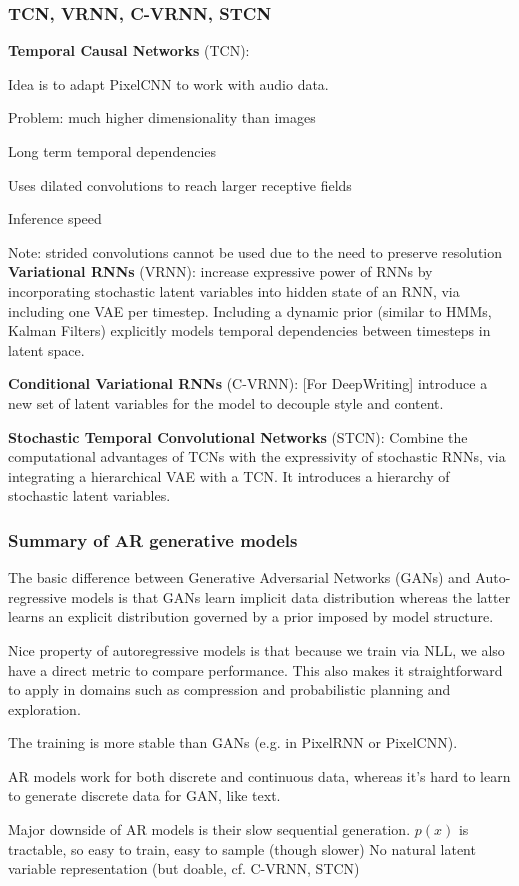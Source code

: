\documentclass[12pt]{article}
\begin{document}
\subsubsection{TCN, VRNN, C-VRNN, STCN}
\textbf{Temporal Causal Networks} (TCN):
\ulb
\item Idea is to adapt PixelCNN to work with audio data.
\item Problem: much higher dimensionality than images
\item Long term temporal dependencies
\item Uses dilated convolutions to reach larger receptive fields
\item Inference speed
\item Note: strided convolutions cannot be used due to the need to preserve resolution
\ule
\textbf{Variational RNNs} (VRNN): increase expressive power of RNNs by incorporating stochastic latent variables into hidden state of an RNN, via including one VAE per timestep. Including a dynamic prior (similar to HMMs, Kalman Filters) explicitly models temporal dependencies between timesteps in latent space.
\par \textbf{Conditional Variational RNNs} (C-VRNN): [For DeepWriting] introduce a new set of latent variables for the model to decouple style and content.
\par \textbf{Stochastic Temporal Convolutional Networks} (STCN): Combine the computational advantages of TCNs with the expressivity of stochastic RNNs, via integrating a hierarchical VAE with a TCN. It introduces a hierarchy of stochastic latent variables.

\subsubsection{Summary of AR generative models}
\ulb
\item The basic difference between Generative Adversarial Networks (GANs) and Auto-regressive models is that GANs learn implicit data distribution whereas the latter learns an explicit distribution governed by a prior imposed by model structure.
\item Nice property of autoregressive models is that because we train via NLL, we also have a direct metric to compare performance. This also makes it straightforward to apply in domains such as compression and probabilistic planning and exploration.
\item The training is more stable than GANs (e.g. in PixelRNN or PixelCNN).
\item AR models work for both discrete and continuous data, whereas it's hard to learn to generate discrete data for GAN, like text.
\item Major downside of AR models is their slow sequential generation.
\pro $p(x)$ is tractable, so easy to train, easy to sample (though slower)
\con No natural latent variable representation (but doable, cf. C-VRNN, STCN)
\ule
\end{document}
